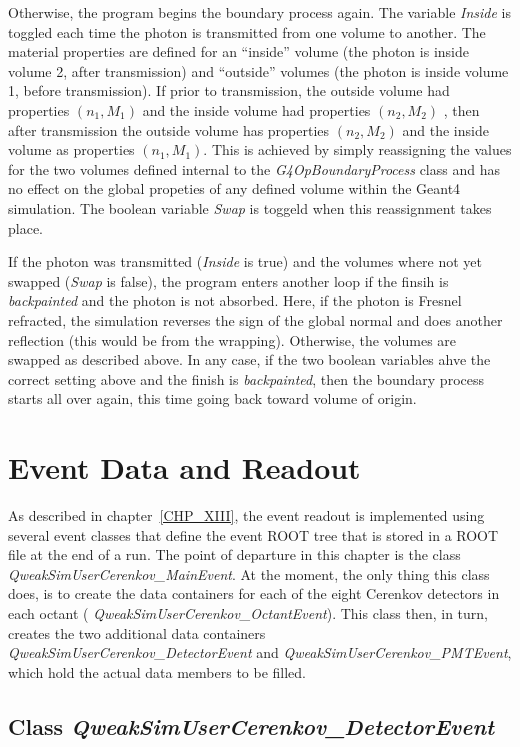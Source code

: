 Otherwise, the program begins the boundary process again. The variable
{\em Inside} is toggled each time the photon is transmitted from one
volume to another. The material properties are defined for an
``inside'' volume (the photon is inside volume 2, after transmission)
and ``outside'' volumes (the photon is inside volume 1, before
transmission). If prior to transmission, the outside volume had
properties $(n_1,M_1)$ and the inside volume had properties
$(n_2,M_2)$ , then after transmission the outside volume has
properties $(n_2,M_2)$ and the inside volume as properties
$(n_1,M_1)$. This is achieved by simply reassigning the values for the
two volumes defined internal to the {\em G4OpBoundaryProcess} class
and has no effect on the global propeties of any defined volume within
the Geant4 simulation. The boolean variable {\em Swap} is toggeld 
when this reassignment takes place.

If the photon was transmitted ({\em Inside} is true) and the volumes 
where not yet swapped ({\em Swap} is false), the program enters another
loop if the finsih is {\em backpainted} and the photon is not absorbed.
Here, if the photon is Fresnel refracted, the simulation reverses the
sign of the global normal and does another reflection (this would be
from the wrapping). Otherwise, the volumes are swapped as described 
above. In any case, if the two boolean variables ahve the correct setting
above and the finish is {\em backpainted}, then the boundary process
starts all over again, this time going back toward volume of origin.

\section{Event Data and Readout}

As described in chapter~\ref{CHP_XIII}, the event readout is
implemented using several event classes that define the event ROOT
tree that is stored in a ROOT file at the end of a run. The point of
departure in this chapter is the class {\em
QweakSimUserCerenkov\_MainEvent}. At the moment, the only thing this
class does, is to create the data containers for each of the eight
Cerenkov detectors in each octant ({\em
QweakSimUserCerenkov\_OctantEvent}).  This class then, in turn, creates
the two additional data containers {\em QweakSimUserCerenkov\_DetectorEvent} 
and {\em QweakSimUserCerenkov\_PMTEvent}, which hold the actual data members to
be filled.

\subsection{Class {\em QweakSimUserCerenkov\_DetectorEvent}}

